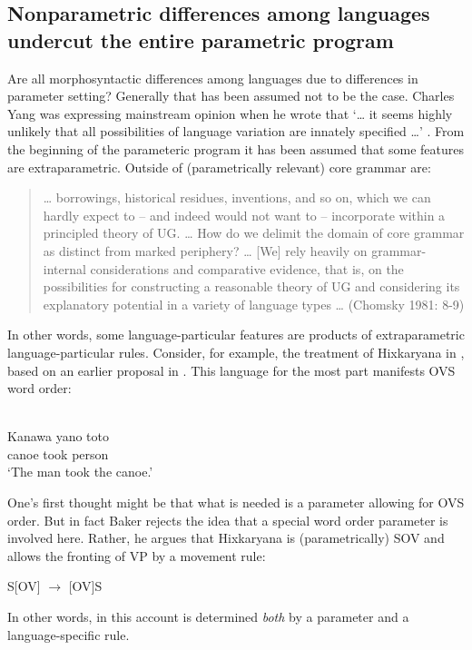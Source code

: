 \documentclass[output=paper,
modfonts
]{LSP/langsci}
\begin{document}
\subsection{Nonparametric differences among languages undercut the entire
parametric program}

Are all morphosyntactic differences among languages due to differences
in parameter setting? Generally that has been assumed not to be the
case. Charles Yang was expressing mainstream opinion when he wrote that
`\ldots{} it seems highly unlikely that all possibilities of language
variation are innately specified \ldots{}' \citep[191]{yang2011n}. From the
beginning of the parameteric program it has been assumed that some
features are extraparametric. Outside of (parametrically relevant) core
grammar are:

\begin{quote}
\ldots{} borrowings, historical residues, inventions, and so on, which
we can hardly expect to  --  and indeed would not want to  --  incorporate
within a principled theory of UG. \ldots{} How do we delimit the domain
of core grammar as distinct from marked periphery? \ldots{} {[}We{]}
rely heavily on grammar-internal considerations and comparative
evidence, that is, on the possibilities for constructing a reasonable
theory of UG and considering its explanatory potential in a variety of
language types \ldots{} (Chomsky 1981: 8-9)
\end{quote}

In other words, some language-particular features are products of
extraparametric language-particular rules. Consider, for example, the
treatment of Hixkaryana in \citet{baker2001}, based on an earlier proposal in
\citet{kayne1994}. This language for the most part manifests OVS word order:

\ea {}\\
 \gll Kanawa yano toto\\  
canoe took person\\
\glt `The man took the canoe.' 
\z

One's first thought might be that what is needed is a parameter allowing
for OVS order. But in fact Baker rejects the idea that a special word
order parameter is involved here. Rather, he argues that Hixkaryana is
(parametrically) SOV and allows the fronting of VP by a movement rule:

\ea S{[}OV{]} $\rightarrow$ {[}OV{]}S
\z

In other words, in this account  is determined \emph{both} by
a parameter and a language-specific rule.
\end{document}
